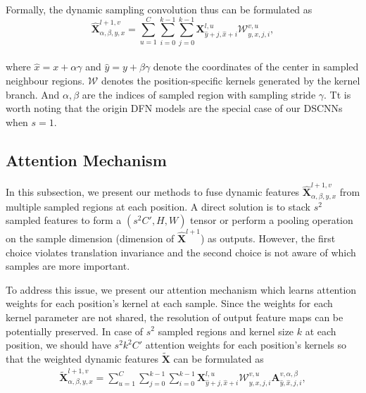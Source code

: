 \documentclass[runningheads]{llncs}
\begin{document}
Formally, the dynamic sampling convolution thus can be formulated as
\begin{equation}
    \hat{\textbf{X}}_{\alpha,\beta,y,x}^{l+1,v} = \sum\limits_{u = 1}^{C}\sum\limits_{i = 0}^{k-1}\sum\limits_{j = 0}^{k-1} \textbf{X}_{\hat{y}+j,\hat{x}+i}^{l,u}\mathcal{W}^{v,u}_{y,x,j,i},
    \label{eq:dynamic_sampling_conv}
\end{equation}\\
where $\hat{x}= x+\alpha\gamma$ and $\hat{y}= y+\beta\gamma$ denote the coordinates of the center in sampled neighbour regions. $\mathcal{W}$ denotes the position-specific kernels generated by the kernel branch. And $\alpha, \beta$ are the indices of sampled region with sampling stride  $\gamma$. Tt is worth noting that the origin DFN models are the special case of our DSCNNs when $s=1$.

\subsection{Attention Mechanism}
\label{sec:3.3}
In this subsection, we present our methods to fuse dynamic features $\hat{\textbf{X}}_{\alpha,\beta,y,x}^{l+1,v}$ from multiple sampled regions at each position. 
A direct solution is to stack $s^2$ sampled features to form a $(s^2C', H, W)$ tensor or perform a pooling operation on the sample dimension (\ie \first dimension of $\hat{\textbf{X}}^{l+1}$) as outputs. However, the first choice violates translation invariance and the second choice is not aware of which samples are more important.

To address this issue, we present our attention mechanism which learns attention weights for each position's kernel at each sample. Since the weights for each kernel parameter are not shared, the resolution of output feature maps can be potentially preserved. In case of $s^2$ sampled regions and kernel size $k$ at each position, we should have $s^2k^2C'$ attention weights for each position's kernels so that the weighted dynamic features $ \widetilde{\textbf{X}}$ can be formulated as 
\begin{align}
 \widetilde{\textbf{X}}_{\alpha,\beta,y,x}^{l+1,v} =\sum\limits_{u = 1}^{C}\sum\limits_{j = 0}^{k-1}\sum\limits_{i = 0}^{k-1} \textbf{X}_{\hat{y}+j,\hat{x}+i}^{l,u}\mathcal{W}^{v,u}_{y,x,j,i}\textbf{A}^{v,\alpha,\beta}_{\hat{y},\hat{x},j,i},
\label{eq:attention_origin}
\end{align}
\end{document}
